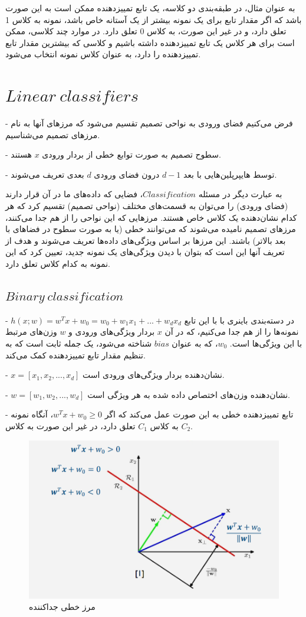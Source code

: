 \documentclass[12pt]{article}
\begin{document}
به عنوان مثال، در طبقه‌بندی دو کلاسه، یک تابع تمییزدهنده ممکن است به این صورت باشد که اگر مقدار تابع برای یک نمونه بیشتر از یک آستانه خاص باشد، نمونه به کلاس 1 تعلق دارد، و در غیر این صورت، به کلاس 0 تعلق دارد. در موارد چند کلاسی، ممکن است برای هر کلاس یک تابع تمییزدهنده داشته باشیم و کلاسی که بیشترین مقدار تابع تمییزدهنده را دارد، به عنوان کلاس نمونه انتخاب می‌شود.

\section{$Linear\:classifiers$}

- فرض می‌کنیم فضای ورودی به نواحی تصمیم تقسیم می‌شود که مرزهای آنها به نام مرزهای تصمیم می‌شناسیم.

- سطوح تصمیم به صورت توابع خطی از بردار ورودی \(x\) هستند.

- توسط هایپرپلین‌هایی با بعد \(d-1\) درون فضای ورودی \(d\) بعدی تعریف می‌شوند.

به عبارت دیگر در مسئله $Classification$، فضایی که داده‌های ما در آن قرار دارند (فضای ورودی) را می‌توان به قسمت‌های مختلف (نواحی تصمیم) تقسیم کرد که هر کدام نشان‌دهنده یک کلاس خاص هستند. مرزهایی که این نواحی را از هم جدا می‌کنند، مرزهای تصمیم نامیده می‌شوند که می‌توانند خطی (یا به صورت سطوح در فضاهای با بعد بالاتر) باشند. این مرزها بر اساس ویژگی‌های داده‌ها تعریف می‌شوند و هدف از تعریف آنها این است که بتوان با دیدن ویژگی‌های یک نمونه جدید، تعیین کرد که این نمونه به کدام کلاس تعلق دارد.\subsection{
$Binary\:classification$ }
- \(h(x; w) = w^Tx + w_0 = w_0 + w_1x_1 + ... + w_dx_d\) 
در دسته‌بندی باینری با با این تابع نمونه‌ها را از هم جدا می‌کنیم، که در آن \(x\) بردار ویژگی‌های ورودی و \(w\) وزن‌های مرتبط با این ویژگی‌ها است. \(w_0\)، که به عنوان $bias$ شناخته می‌شود، یک جمله ثابت است که به تنظیم مقدار تابع تمییزدهنده کمک می‌کند.

- \(x = [x_1, x_2, ..., x_d]\) نشان‌دهنده بردار ویژگی‌های ورودی است.

- \(w = [w_1, w_2, ..., w_d]\) نشان‌دهنده وزن‌های اختصاص داده شده به هر ویژگی است.

- تابع تمییزدهنده خطی به این صورت عمل می‌کند که اگر \(w^Tx + w_0 \geq 0\)، آنگاه نمونه به کلاس \(C_1\) تعلق دارد، در غیر این صورت به کلاس \(C_2\).

\begin{figure}
    \centering
    \includegraphics[width=0.5\linewidth]{image.png}
    \caption{مرز خطی جداکننده}
    \label{fig:enter-label}
\label{fig:f1}
\end{figure}
\end{document}
